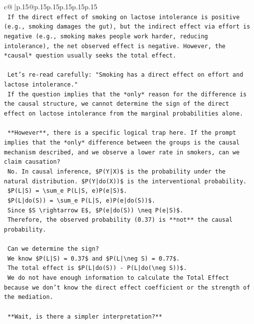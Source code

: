 \documentclass{article}
\begin{document}
{\begin{supertabular}{c@{$\;$}|p{.15\linewidth}@{}p{.15\linewidth}p{.15\linewidth}p{.15\linewidth}p{.15\linewidth}p{.15\linewidth}}
{{{\\ 
\texttt{    If the direct effect of smoking on lactose intolerance is positive (e.g., smoking damages the gut), but the indirect effect via effort is negative (e.g., smoking makes people work harder, reducing intolerance), the net observed effect is negative. However, the *causal* question usually seeks the total effect.} \\
\\ 
\texttt{    Let's re{-}read carefully: "Smoking has a direct effect on effort and lactose intolerance."} \\
\texttt{    If the question implies that the *only* reason for the difference is the causal structure, we cannot determine the sign of the direct effect on lactose intolerance from the marginal probabilities alone.} \\
\\ 
\texttt{    **However**, there is a specific logical trap here. If the prompt implies that the *only* difference between the groups is the causal mechanism described, and we observe a lower rate in smokers, can we claim causation?} \\
\texttt{    No. In causal inference, \$P(Y|X)\$ is the probability under the natural distribution. \$P(Y|do(X))\$ is the interventional probability.} \\
\texttt{    \$P(L|S) = \textbackslash{}sum\_e P(L|S, e)P(e|S)\$.} \\
\texttt{    \$P(L|do(S)) = \textbackslash{}sum\_e P(L|S, e)P(e|do(S))\$.} \\
\texttt{    Since \$S \textbackslash{}rightarrow E\$, \$P(e|do(S)) \textbackslash{}neq P(e|S)\$.} \\
\texttt{    Therefore, the observed probability (0.37) is **not** the causal probability.} \\
\\ 
\texttt{    Can we determine the sign?} \\
\texttt{    We know \$P(L|S) = 0.37\$ and \$P(L|\textbackslash{}neg S) = 0.77\$.} \\
\texttt{    The total effect is \$P(L|do(S)) {-} P(L|do(\textbackslash{}neg S))\$.} \\
\texttt{    We do not have enough information to calculate the Total Effect because we don't know the direct effect coefficient or the strength of the mediation.} \\
\\ 
\texttt{    **Wait, is there a simpler interpretation?**} \\
}}}
\end{supertabular}}
\end{document}
